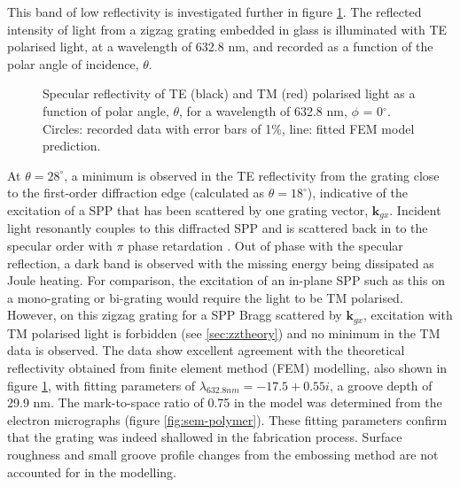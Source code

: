 This band of low reflectivity is investigated further in figure \ref{fig:anglescan}. The reflected intensity of light from a zigzag grating embedded in glass is illuminated with TE polarised light, at a wavelength of 632.8 nm, and recorded as a function of the polar angle of incidence, $\theta$. 
\begin{figure}
\begin{center}

\caption[Plot of TE and TM polarised light reflectivity from the grating as a function of polar angle.]{Specular reflectivity of TE (black) and TM (\color{red}red\color{black}) polarised light as a function of polar angle, $\theta$, for a wavelength of 632.8 nm, $\phi$ = 0$^\circ$. Circles: recorded data with error bars of 1\%, line: fitted FEM model prediction.\label{fig:anglescan}}
\end{center}
\end{figure}
At $\theta = 28^\circ$, a minimum is observed in the TE reflectivity from the grating close to the first-order diffraction edge (calculated as $\theta = 18^\circ$), indicative of the excitation of a SPP that has been scattered by one grating vector, $\mathbf{k}_{gx}$. Incident light resonantly couples to this diffracted SPP and is scattered back in to the specular order with $\pi$ phase retardation \cite{Herminghaus:94}. Out of phase with the specular reflection, a dark band is observed with the missing energy being dissipated as Joule heating. For comparison, the excitation of an in-plane SPP such as this on a mono-grating or bi-grating would require the light to be TM polarised. However, on this zigzag grating for a SPP Bragg scattered by $\mathbf{k}_{gx}$, excitation with TM polarised light is forbidden (see \ref{sec:zztheory}) and no minimum in the TM data is observed. The data show excellent agreement with the theoretical reflectivity obtained from finite element method (FEM) modelling, also shown in figure \ref{fig:anglescan}, with fitting parameters of $\lambda_{632.8 nm} = -17.5 + 0.55i$, a groove depth of 29.9 nm. The mark-to-space ratio of 0.75 in the model was determined from the electron micrographs (figure \ref{fig:sem-polymer}). These fitting parameters confirm that the grating was indeed shallowed in the fabrication process. Surface roughness and small groove profile changes from the embossing method are not accounted for in the modelling.

